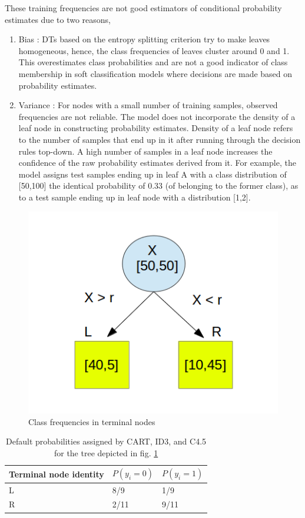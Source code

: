 \documentclass[final,3p,times,twocolumn]{elsarticle}
\begin{document}
These training frequencies are not good estimators of conditional probability estimates due to two reasons, 

\begin{enumerate}
\item{Bias : DTs based on the entropy splitting criterion try to make leaves homogeneous, hence, the class frequencies of leaves cluster around 0 and 1. This overestimates class probabilities and are not a good indicator of class membership in soft classification models where decisions are made based on probability estimates.}
\item{Variance : For nodes with a small number of training samples, observed frequencies are not reliable. The model does not incorporate the density of a leaf node in constructing probability estimates. Density of a leaf node refers to the number of samples that end up in it after running through the decision rules top-down. A high number of samples in a leaf node increases the confidence of the raw probability estimates derived from it. For example, the model assigns test samples ending up in leaf A with a class distribution of [50,100] the identical probability of 0.33 (of belonging to the former class), as to a test sample ending up in leaf node with a distribution [1,2].}
\end{enumerate}

\begin{figure}
\includegraphics[scale=0.5]{Images/prob_freq.png}
\caption{Class frequencies in terminal nodes}
\label{prob_freq_draw}
\end{figure}

\begin{table}
\begin{tabular}{lll}
Terminal node identity & $P(y_{i} = 0)$ & $P(y_{i} = 1)$ \\
\toprule
L & 8/9 & 1/9 \\
R & 2/11 & 9/11 \\ 
\end{tabular}
\caption{Default probabilities assigned by CART, ID3, and C4.5 for the tree depicted in fig. \ref{prob_freq_draw}}
\label{prob_default}
\end{table}
\end{document}
